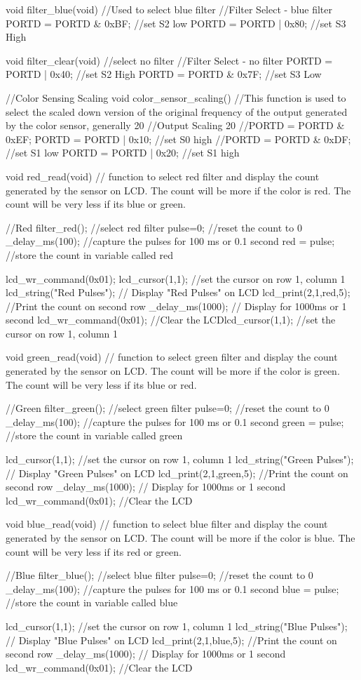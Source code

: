 void filter_blue(void)	//Used to select blue filter
{
	//Filter Select - blue filter
	PORTD = PORTD & 0xBF; //set S2 low
	PORTD = PORTD | 0x80; //set S3 High
}

void filter_clear(void)	//select no filter
{
	//Filter Select - no filter
	PORTD = PORTD | 0x40; //set S2 High
	PORTD = PORTD & 0x7F; //set S3 Low
}

//Color Sensing Scaling
void color_sensor_scaling()		//This function is used to select the scaled down version of the original frequency of the output generated by the color sensor, generally 20%
{
	//Output Scaling 20%
	//PORTD = PORTD & 0xEF;
	PORTD = PORTD | 0x10; //set S0 high
	//PORTD = PORTD & 0xDF; //set S1 low
	PORTD = PORTD | 0x20; //set S1 high
}

void red_read(void) // function to select red filter and display the count generated by the sensor on LCD. The count will be more if the color is red. The count will be very less if its blue or green.
{
	//Red
	filter_red(); //select red filter
	pulse=0; //reset the count to 0
	_delay_ms(100); //capture the pulses for 100 ms or 0.1 second
	red = pulse;  //store the count in variable called red
	
	lcd_wr_command(0x01);
	lcd_cursor(1,1);  //set the cursor on row 1, column 1
	lcd_string("Red Pulses"); // Display "Red Pulses" on LCD
	lcd_print(2,1,red,5);  //Print the count on second row
	_delay_ms(1000);	// Display for 1000ms or 1 second
	lcd_wr_command(0x01); //Clear the LCDlcd_cursor(1,1);  //set the cursor on row 1, column 1
}

void green_read(void) // function to select green filter and display the count generated by the sensor on LCD. The count will be more if the color is green. The count will be very less if its blue or red.
{
	//Green
	filter_green(); //select green filter
	pulse=0; //reset the count to 0
	_delay_ms(100); //capture the pulses for 100 ms or 0.1 second
	green = pulse;  //store the count in variable called green
	
	lcd_cursor(1,1);  //set the cursor on row 1, column 1
	lcd_string("Green Pulses"); // Display "Green Pulses" on LCD
	lcd_print(2,1,green,5);  //Print the count on second row
	_delay_ms(1000);	// Display for 1000ms or 1 second
	lcd_wr_command(0x01); //Clear the LCD
}

void blue_read(void) // function to select blue filter and display the count generated by the sensor on LCD. The count will be more if the color is blue. The count will be very less if its red or green.
{
	//Blue
	filter_blue(); //select blue filter
	pulse=0; //reset the count to 0
	_delay_ms(100); //capture the pulses for 100 ms or 0.1 second
	blue = pulse;  //store the count in variable called blue

    lcd_cursor(1,1);  //set the cursor on row 1, column 1
    lcd_string("Blue Pulses"); // Display "Blue Pulses" on LCD
    lcd_print(2,1,blue,5);  //Print the count on second row
    _delay_ms(1000);	// Display for 1000ms or 1 second
    lcd_wr_command(0x01); //Clear the LCD
}

